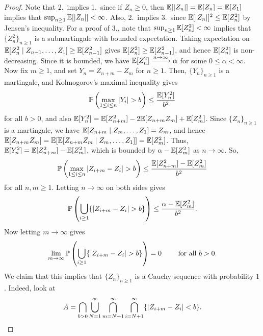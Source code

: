 \begin{proof}
    Note that 2.~implies 1.~since if $Z_{n} \geq 0$, then $\mathbb{E}[\left| Z_{n} \right|] = \mathbb{E}[Z_{n}] = \mathbb{E}[Z_{1}]$ implies that $\sup_{n \geq 1} \mathbb{E}[\left| Z_{n} \right|] < \infty$. Also, 2.~implies 3.~since $\mathbb{E}[\left| Z_{n} \right|]^{2} \leq \mathbb{E}[Z_{n}^{2}]$ by Jensen's inequality. For a proof of 3., note that $\sup_{n \geq 1} \mathbb{E}[Z_{n}^{2}] < \infty$ implies that $\{Z_{n}^{2}\}_{n \geq 1}$ is a submartingale with bounded expectation. Taking expectation on $\mathbb{E}[Z_{n}^{2} \mid Z_{n-1},\ldots,Z_{1}] \geq \mathbb{E}[Z_{n-1}^{2}]$ gives $\mathbb{E}[Z_{n}^{2}] \geq \mathbb{E}[Z_{n-1}^{2}]$, and hence $\mathbb{E}[Z_{n}^{2}]$ is non-decreasing. Since it is bounded, we have $\mathbb{E}[Z_{n}^{2}] \xrightarrow{n \to \infty} \alpha$ for some $0 \leq \alpha < \infty$. Now fix $m \geq 1$, and set $Y_{n} = Z_{n+m}-Z_{m}$ for $n \geq 1$. Then, $\{Y_{n}\}_{n \geq 1}$ is a martingale, and Kolmogorov's maximal inequality gives
    \begin{align}
        \mathbb{P}\left( \max_{1 \leq i \leq n} \left| Y_{i} \right| > b \right) \leq \frac{\mathbb{E}[Y_{n}^{2}]}{b^{2}}
    \end{align}
    for all $b > 0$, and also $\mathbb{E}[Y_{n}^{2}] = \mathbb{E}[Z_{n+m}^{2}] - 2\mathbb{E}[Z_{n+m}Z_{m}] + \mathbb{E}[Z_{m}^{2}]$. Since $\{Z_{n}\}_{n \geq 1}$ is a martingale, we have $\mathbb{E}[Z_{n+m} \mid Z_{m},\ldots,Z_{1}] = Z_{m}$, and hence $\mathbb{E}[Z_{n+m}Z_{m}] = \mathbb{E}[\mathbb{E}[Z_{n+m}Z_{m} \mid Z_{m},\ldots,Z_{1}]] = \mathbb{E}[Z_{m}^{2}]$. Thus, $\mathbb{E}[Y_{n}^{2}] = \mathbb{E}[Z_{n+m}^{2}] - \mathbb{E}[Z_{m}^{2}]$, which is bounded by $\alpha - \mathbb{E}[Z_{m}^{2}]$ as $n \to \infty$. So,
    \begin{align}
        \mathbb{P}\left( \max_{1 \leq i \leq n} \left| Z_{i+m}-Z_{i} \right| > b\right) \leq \frac{\mathbb{E}[Z_{n+m}^{2}]-\mathbb{E}[Z_{m}^{2}]}{b^{2}}
    \end{align}
    for all $n,m \geq 1$. Letting $n \to \infty$ on both sides gives
    \begin{align}
        \mathbb{P}\left( \bigcup_{i \geq 1} \{\left| Z_{i+m}-Z_{i} \right| > b\} \right) \leq \frac{\alpha - \mathbb{E}[Z_{m}^{2}]}{b^{2}}.
    \end{align}
    Now letting $m \to \infty$ gives
    \begin{align}
        \lim_{m \to \infty} \mathbb{P}\left( \bigcup_{i \geq 1} \{\left| Z_{i+m}-Z_{i} \right| > b\} \right) = 0 \qquad \text{ for all } b > 0.
    \end{align}
    We claim that this implies that $\{Z_{n}\}_{n \geq 1}$ is a Cauchy sequence with probability $1$. Indeed, look at
    \begin{align}
        A = \bigcap_{b > 0} \bigcup_{N=1}^{\infty} \bigcap_{m = N+1}^{\infty} \bigcap_{i=N+1}^{\infty} \{\abs{Z_{i+m}-Z_{i}} < b\}.

\end{align}
\end{proof}
